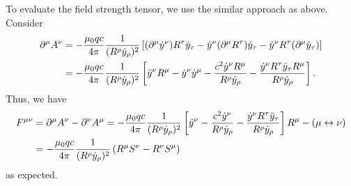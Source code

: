 To evaluate the field strength tensor, we use the similar approach as above. Consider
\begin{align}
    \partial^\mu A^\nu  &= -\frac{\mu_0 qc}{4\pi}\frac{1}{(R^\rho\dot{y}_\rho)^2}\left[(\partial^\mu \dot{y}^\nu)R^\tau\dot{y}_\tau -  \dot{y}^\nu(\partial^\mu R^\tau)\dot{y}_\tau -  \dot{y}^\nu R^\tau(\partial^\mu\dot{y}_\tau)\right] \notag
    \\
    &= -\frac{\mu_0 qc}{4\pi}\frac{1}{(R^\rho\dot{y}_\rho)^2}\left[\ddot{y}^\nu R^\mu -  \dot{y}^\nu\dot{y}^\mu - \frac{c^2\dot{y}^\nu  R^\mu}{R^\rho \dot{y}_\rho}-  \frac{\dot{y}^\nu R^\tau\ddot{y}_\tau R^\mu}{R^\rho \dot{y}_\rho}\right].
\end{align}
Thus, we have
\begin{align}
    F^{\mu\nu} &= \partial^\mu A^\nu - \partial^\nu A^\mu= -\frac{\mu_0 qc}{4\pi}\frac{1}{(R^\rho\dot{y}_\rho)^2}\left[\ddot{y}^\nu - \frac{c^2\dot{y}^\nu }{R^\rho \dot{y}_\rho}-  \frac{\dot{y}^\nu R^\tau\ddot{y}_\tau }{R^\rho \dot{y}_\rho}\right]R^\mu - (\mu\leftrightarrow\nu)   \notag \\
    &=-\frac{\mu_0 qc}{4\pi}
  \frac{1}{(R^\rho\dot{y}_\rho)^2}
  \left(R^\mu S^\nu - R^\nu S^\mu\right)
\end{align}
as expected.

